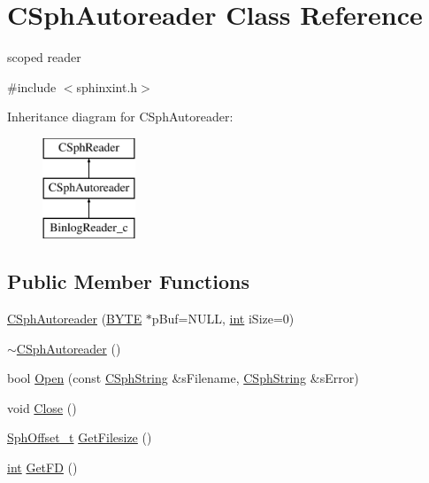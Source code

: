 \hypertarget{classCSphAutoreader}{\section{C\-Sph\-Autoreader Class Reference}
\label{classCSphAutoreader}
}


scoped reader  




{\ttfamily \#include $<$sphinxint.\-h$>$}

Inheritance diagram for C\-Sph\-Autoreader\-:\begin{figure}[H]
\begin{center}
\leavevmode
\includegraphics[height=3.000000cm]{classCSphAutoreader}
\end{center}
\end{figure}
\subsection*{Public Member Functions}
\begin{DoxyCompactItemize}
\item 
\hyperlink{classCSphAutoreader_a70ce1d7e69137ddeb407b31b0cf8048d}{C\-Sph\-Autoreader} (\hyperlink{sphinxstd_8h_a4ae1dab0fb4b072a66584546209e7d58}{B\-Y\-T\-E} $\ast$p\-Buf=N\-U\-L\-L, \hyperlink{sphinxexpr_8cpp_a4a26e8f9cb8b736e0c4cbf4d16de985e}{int} i\-Size=0)
\item 
\hyperlink{classCSphAutoreader_a22af92df3e98953f67ee5c4c9dd93fd6}{$\sim$\-C\-Sph\-Autoreader} ()
\item 
bool \hyperlink{classCSphAutoreader_abfa9af28a61212a4867edcc27d706258}{Open} (const \hyperlink{structCSphString}{C\-Sph\-String} \&s\-Filename, \hyperlink{structCSphString}{C\-Sph\-String} \&s\-Error)
\item 
void \hyperlink{classCSphAutoreader_a5febcbe5417adbb07291e6b5b1bc9b4f}{Close} ()
\item 
\hyperlink{sphinx_8h_a0fb3b64afebef33c61367714754eaa90}{Sph\-Offset\-\_\-t} \hyperlink{classCSphAutoreader_a3307946351419bc9832c761ee052fdaa}{Get\-Filesize} ()
\item 
\hyperlink{sphinxexpr_8cpp_a4a26e8f9cb8b736e0c4cbf4d16de985e}{int} \hyperlink{classCSphAutoreader_a10b1991daebd28d341922f80b6a2e0a6}{Get\-F\-D} ()
\end{DoxyCompactItemize}
